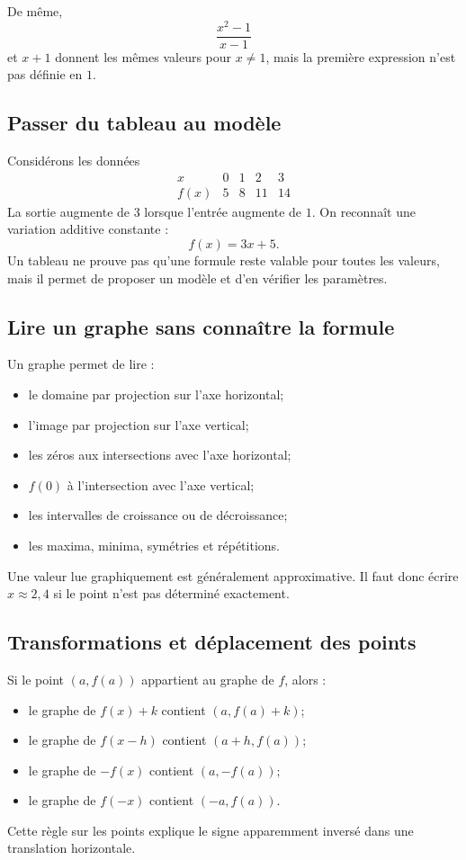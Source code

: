 \documentclass[12pt,a4paper,openany]{book}
\begin{document}
De même,
\[
\frac{x^2-1}{x-1}
\]
et $x+1$ donnent les mêmes valeurs pour $x\neq1$, mais la première expression n'est pas définie en $1$.

\subsection{Passer du tableau au modèle}

Considérons les données
\[
\begin{array}{c|cccc}
x&0&1&2&3\\\hline
f(x)&5&8&11&14
\end{array}
\]
La sortie augmente de $3$ lorsque l'entrée augmente de $1$. On reconnaît une variation additive constante :
\[
f(x)=3x+5.
\]
Un tableau ne prouve pas qu'une formule reste valable pour toutes les valeurs, mais il permet de proposer un modèle et d'en vérifier les paramètres.

\subsection{Lire un graphe sans connaître la formule}

Un graphe permet de lire :
\begin{itemize}
\item le domaine par projection sur l'axe horizontal;
\item l'image par projection sur l'axe vertical;
\item les zéros aux intersections avec l'axe horizontal;
\item $f(0)$ à l'intersection avec l'axe vertical;
\item les intervalles de croissance ou de décroissance;
\item les maxima, minima, symétries et répétitions.
\end{itemize}
Une valeur lue graphiquement est généralement approximative. Il faut donc écrire $x\approx2{,}4$ si le point n'est pas déterminé exactement.

\subsection{Transformations et déplacement des points}

Si le point $(a,f(a))$ appartient au graphe de $f$, alors :
\begin{itemize}
\item le graphe de $f(x)+k$ contient $(a,f(a)+k)$;
\item le graphe de $f(x-h)$ contient $(a+h,f(a))$;
\item le graphe de $-f(x)$ contient $(a,-f(a))$;
\item le graphe de $f(-x)$ contient $(-a,f(a))$.
\end{itemize}
Cette règle sur les points explique le signe apparemment inversé dans une translation horizontale.
\end{document}
